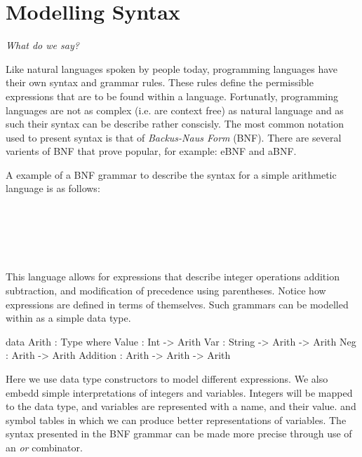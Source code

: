 \section{Modelling Syntax}
\label{sec:notation}
\begin{center}\large\em
What do we say?
\end{center}

Like natural languages spoken by people today, programming languages have their own syntax and grammar rules.
These rules define the permissible expressions that are to be found within a language.
Fortunatly, programming languages are not as complex (i.e. are context free) as natural language and as such their syntax can be describe rather conscisly.
The most common notation used to present syntax is that of \emph{Backus-Naus Form} (BNF).
There are several varients of BNF that prove popular, for example: eBNF and aBNF.

A example of a BNF grammar to describe the syntax for a simple arithmetic language \allang{} is as follows:

\begin{bnf}
\\
\\
\\
\\
\end{bnf}

\noindent
This language allows for expressions that describe integer operations addition subtraction, and modification of precedence using parentheses.
Notice how expressions are defined in terms of themselves.
Such grammars can be modelled within \idris{} as a simple data type.

\begin{code}
data Arith : Type where
  Value    : Int             -> Arith
  Var      : String -> Arith -> Arith
  Neg      : Arith           -> Arith
  Addition : Arith  -> Arith -> Arith
\end{code}

\noindent
Here we use data type constructors to model different expressions.
We also embedd simple interpretations of integers and variables.
Integers will be mapped to the \idris{} data type, and variables are represented with a name, and their value.
and symbol tables in which we can produce better representations of variables.
The syntax presented in the BNF grammar can be made more precise through use of an \emph{or} combinator.

